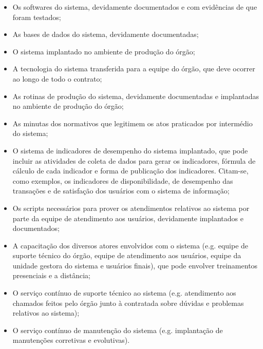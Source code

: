 \begin{itemize}
\item Os softwares do sistema, devidamente documentados e com evidências de que foram testados;
\item As bases de dados do sistema, devidamente documentadas;
\item O sistema implantado no ambiente de produção do órgão;
\item A tecnologia do sistema transferida para a equipe do órgão, que deve ocorrer ao longo de todo o contrato;
\item As rotinas de produção do sistema, devidamente documentadas e implantadas no ambiente de produção do órgão;
\item As minutas dos normativos que legitimem os atos praticados por intermédio do sistema;
\item O sistema de indicadores de desempenho do sistema implantado, que pode incluir as atividades de coleta de dados para gerar os indicadores, fórmula de cálculo de cada indicador e forma de publicação dos indicadores. Citam-se, como exemplos, os indicadores de disponibilidade, de desempenho das transações e de satisfação dos usuários com o sistema de informação;
\item Os scripts necessários para prover os atendimentos relativos ao sistema por parte da equipe de atendimento aos usuários, devidamente implantados e documentados;
\item A capacitação dos diversos atores envolvidos com o sistema (e.g. equipe de suporte técnico do órgão, equipe de atendimento aos usuários, equipe da unidade gestora do sistema e usuários finais), que pode envolver treinamentos presenciais e a distância;
\item O serviço contínuo de suporte técnico ao sistema (e.g. atendimento aos chamados feitos pelo órgão junto à contratada sobre dúvidas e problemas relativos ao sistema);
\item O serviço contínuo de manutenção do sistema (e.g. implantação de manutenções corretivas e evolutivas).
\end{itemize} 


